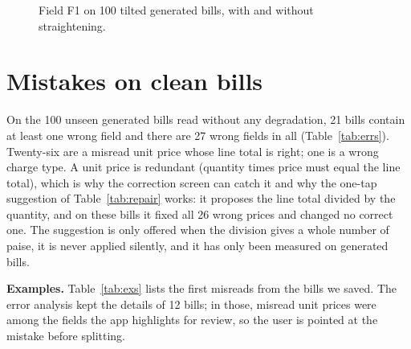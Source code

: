 
\begin{figure}[!ht]
\centering
{}
\caption{Field F1 on 100 tilted generated bills, with and without straightening.}
\end{figure}

\section{Mistakes on clean bills}\label{app:err}
On the 100 unseen generated bills read without any degradation, 21 bills contain at least one wrong field and there are 27 wrong fields in all (Table~\ref{tab:errs}). Twenty-six are a misread unit price whose line total is right; one is a wrong charge type. A unit price is redundant (quantity times price must equal the line total), which is why the correction screen can catch it and why the one-tap suggestion of Table~\ref{tab:repair} works: it proposes the line total divided by the quantity, and on these bills it fixed all 26 wrong prices and changed no correct one. The suggestion is only offered when the division gives a whole number of paise, it is never applied silently, and it has only been measured on generated bills.

\begin{table}[!ht]\centering\footnotesize

\caption{Wrong fields by kind, 100 unseen generated bills.}\label{tab:errs}
\end{table}
\begin{table}[!ht]\centering\footnotesize

\caption{The one-tap rate suggestion, measured on the same bills.}\label{tab:repair}
\end{table}

\textbf{Examples.} Table~\ref{tab:exs} lists the first misreads from the bills we saved. The error analysis kept the details of 12 bills; in those,  misread unit prices were among the fields the app highlights for review, so the user is pointed at the mistake before splitting.


